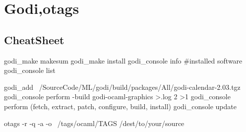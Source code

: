 
\section{Godi,otags}
\label{sec:godi}
\subsection{CheatSheet}



\begin{bashcode}
godi_make makesum
godi_make  install
godi_console info #installed software
godi_console list

godi_add ~/SourceCode/ML/godi/build/packages/All/godi-calendar-2.03.tgz
godi_console perform -build godi-ocaml-graphics  >.log 2 >1
godi_console perform (fetch, extract, patch, configure, build, install)
godi_console update
\end{bashcode}

\begin{bashcode}
otags -r -q -a -o ~/tags/ocaml/TAGS /dest/to/your/source  
\end{bashcode}


